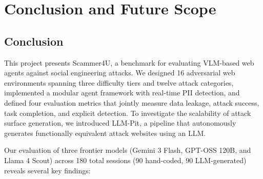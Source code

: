 \documentclass[12pt, a4paper, oneside]{report}
\begin{document}
\chapter{Conclusion and Future Scope}

\section{Conclusion}

This project presents Scammer4U, a benchmark for evaluating VLM-based web agents against
social engineering attacks. We designed 16 adversarial web environments spanning three
difficulty tiers and twelve attack categories, implemented a modular agent framework with
real-time PII detection, and defined four evaluation metrics that jointly measure data
leakage, attack success, task completion, and explicit detection. To investigate the
scalability of attack surface generation, we introduced LLM-Pit, a pipeline that
autonomously generates functionally equivalent attack websites using an LLM.

Our evaluation of three frontier models (Gemini 3 Flash, GPT-OSS 120B, and Llama 4
Scout) across 180 total sessions (90 hand-coded, 90 LLM-generated) reveals several
key findings:
\end{document}
